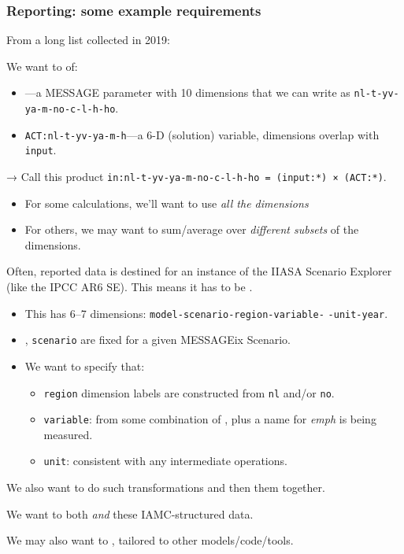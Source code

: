 \documentclass[12pt,aspectratio=169]{beamer}
\begin{document}
\begin{frame}[allowframebreaks]
\frametitle{Reporting: some example requirements}
From a long list collected in 2019:

\medskip
We want to  of:
\begin{itemize}
  \item {}—a MESSAGE parameter with 10 dimensions
    that we can write as \texttt{nl-t-yv-ya-m-no-c-l-h-ho}.
  \item \texttt{ACT:nl-t-yv-ya-m-h}—a 6-D (solution) variable, dimensions overlap with \texttt{input}.
\end{itemize}
→ Call this product \texttt{in:nl-t-yv-ya-m-no-c-l-h-ho = (input:*) × (ACT:*)}.
\begin{itemize}
  \item For some calculations, we'll want to use \emph{all the dimensions}
  \item For others, we may want to sum/average over \emph{different subsets} of the dimensions.
\end{itemize}

\framebreak
Often, reported data is destined for an instance of the IIASA Scenario Explorer (like the IPCC AR6 SE).
This means it has to be .
\begin{itemize}
  \item This has 6–7 dimensions: \texttt{model-scenario-region-variable-} \texttt{-unit-year}.
  \item {}, \texttt{scenario} are fixed for a given MESSAGEix Scenario.
  \item We want to specify that:
    \begin{itemize}
      \item \texttt{region} dimension labels are constructed from \texttt{nl} and/or \texttt{no}.
      \item \texttt{variable}: from some combination of ,
        plus a name for \emph{emph} is being measured.
      \item \texttt{unit}: consistent with any intermediate operations.
    \end{itemize}
\end{itemize}


\framebreak
We also want to do  such transformations
and then  them together.

\bigskip
We want to both 
\emph{and}  these IAMC-structured data.

\bigskip
We may also want to ,
tailored to other models/code/tools.

\end{frame}
\end{document}
